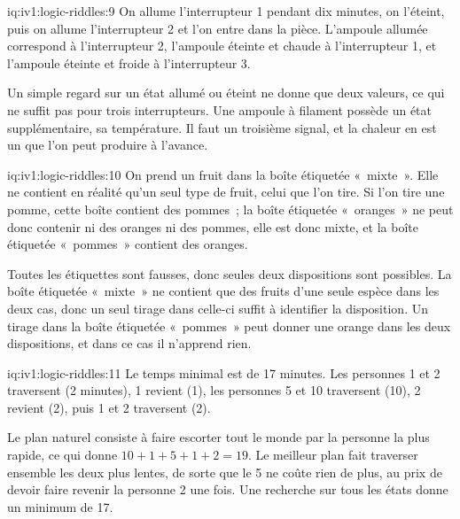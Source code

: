 \begin{solution}{iq:iv1:logic-riddles:9}
On allume l'interrupteur 1 pendant dix minutes, on l'éteint, puis on allume l'interrupteur 2 et l'on entre dans la pièce. L'ampoule allumée correspond à l'interrupteur 2, l'ampoule éteinte et chaude à l'interrupteur 1, et l'ampoule éteinte et froide à l'interrupteur 3.

Un simple regard sur un état allumé ou éteint ne donne que deux valeurs, ce qui ne suffit pas pour trois interrupteurs. Une ampoule à filament possède un état supplémentaire, sa température. Il faut un troisième signal, et la chaleur en est un que l'on peut produire à l'avance.

\end{solution}

\begin{solution}{iq:iv1:logic-riddles:10}
On prend un fruit dans la boîte étiquetée «~mixte~». Elle ne contient en réalité qu'un seul type de fruit, celui que l'on tire. Si l'on tire une pomme, cette boîte contient des pommes~; la boîte étiquetée «~oranges~» ne peut donc contenir ni des oranges ni des pommes, elle est donc mixte, et la boîte étiquetée «~pommes~» contient des oranges.

Toutes les étiquettes sont fausses, donc seules deux dispositions sont possibles. La boîte étiquetée «~mixte~» ne contient que des fruits d'une seule espèce dans les deux cas, donc un seul tirage dans celle-ci suffit à identifier la disposition. Un tirage dans la boîte étiquetée «~pommes~» peut donner une orange dans les deux dispositions, et dans ce cas il n'apprend rien.

\end{solution}

\begin{solution}{iq:iv1:logic-riddles:11}
Le temps minimal est de 17 minutes. Les personnes 1 et 2 traversent (2 minutes), 1 revient (1), les personnes 5 et 10 traversent (10), 2 revient (2), puis 1 et 2 traversent (2).

Le plan naturel consiste à faire escorter tout le monde par la personne la plus rapide, ce qui donne $10 + 1 + 5 + 1 + 2 = 19$. Le meilleur plan fait traverser ensemble les deux plus lentes, de sorte que le 5 ne coûte rien de plus, au prix de devoir faire revenir la personne 2 une fois. Une recherche sur tous les états donne un minimum de 17.

\end{solution}

